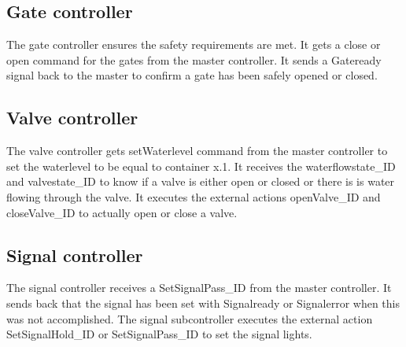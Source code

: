 \subsection{Gate controller}
The gate controller ensures the safety requirements are met. It gets a close or open command for the gates from the master controller. It sends a Gateready signal back to the master to confirm a gate has been safely opened or closed. 
\subsection{Valve controller}
The valve controller gets setWaterlevel command from the master controller to set the waterlevel to be equal to container x.1. It receives the waterflowstate\_ID and valvestate\_ID to know if a valve is either open or closed or there is is water flowing through the valve. It executes the external actions openValve\_ID and closeValve\_ID to actually open or close a valve.  
\subsection{Signal controller}
The signal controller receives a SetSignalPass\_ID from the master controller. It sends back that the signal has been set with Signalready or Signalerror when this was not accomplished. The signal subcontroller executes the external action SetSignalHold\_ID or SetSignalPass\_ID to set the signal lights. 
